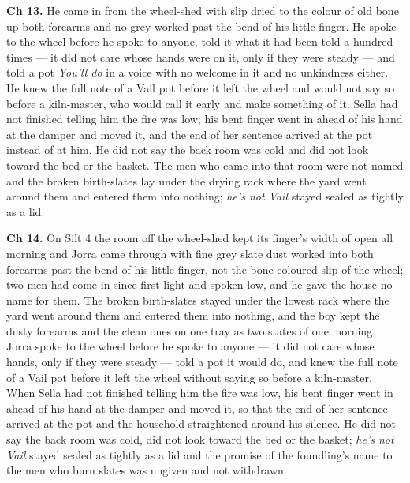 \documentclass{design/chronicle}
\begin{document}
{\textbf{Ch 13.} He came in from the wheel-shed with slip dried to the colour of old bone up both forearms and no grey worked past the bend of his little finger. He spoke to the wheel before he spoke to anyone, told it what it had been told a hundred times --- it did not care whose hands were on it, only if they were steady --- and told a pot \emph{You’ll do} in a voice with no welcome in it and no unkindness either. He knew the full note of a Vail pot before it left the wheel and would not say so before a kiln-master, who would call it early and make something of it. Sella had not finished telling him the fire was low; his bent finger went in ahead of his hand at the damper and moved it, and the end of her sentence arrived at the pot instead of at him. He did not say the back room was cold and did not look toward the bed or the basket. The men who came into that room were not named and the broken birth-slates lay under the drying rack where the yard went around them and entered them into nothing; \emph{he’s not Vail} stayed sealed as tightly as a lid.

\textbf{Ch 14.} On Silt 4 the room off the wheel-shed kept its finger’s width of open all morning and Jorra came through with fine grey slate dust worked into both forearms past the bend of his little finger, not the bone-coloured slip of the wheel; two men had come in since first light and spoken low, and he gave the house no name for them. The broken birth-slates stayed under the lowest rack where the yard went around them and entered them into nothing, and the boy kept the dusty forearms and the clean ones on one tray as two states of one morning. Jorra spoke to the wheel before he spoke to anyone — it did not care whose hands, only if they were steady — told a pot it would do, and knew the full note of a Vail pot before it left the wheel without saying so before a kiln-master. When Sella had not finished telling him the fire was low, his bent finger went in ahead of his hand at the damper and moved it, so that the end of her sentence arrived at the pot and the household straightened around his silence. He did not say the back room was cold, did not look toward the bed or the basket; \emph{he’s not Vail} stayed sealed as tightly as a lid and the promise of the foundling’s name to the men who burn slates was ungiven and not withdrawn.

}
\end{document}
